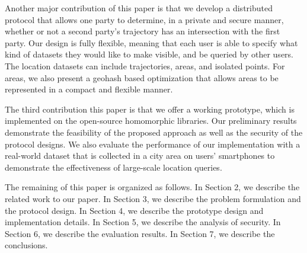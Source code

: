 Another major contribution of this paper is that we develop a distributed protocol that allows one party to determine, in a private and secure manner, whether or not a second party's trajectory has an intersection with the first party. Our design is fully flexible, meaning that each user is able to specify what kind of datasets they would like to make visible, and be queried by other users. The location datasets can include trajectories, areas, and isolated points. For areas, we also present a geohash based optimization that allows areas to be represented in a compact and flexible manner. 

The third contribution this paper is that we offer a working prototype, which is implemented on the open-source homomorphic libraries. Our preliminary results demonstrate the feasibility of the proposed approach as well as the security of the protocol designs. We also evaluate the performance of our implementation with a real-world dataset that is collected in a city area on users' smartphones to demonstrate the effectiveness of large-scale location queries.

The remaining of this paper is organized as follows. In Section 2, we describe the related work to our paper. In Section 3, we describe the problem formulation and the protocol design. In Section 4, we describe the prototype design and implementation details. In Section 5, we describe the analysis of security. In Section 6, we describe the evaluation results. In Section 7, we describe the conclusions.
